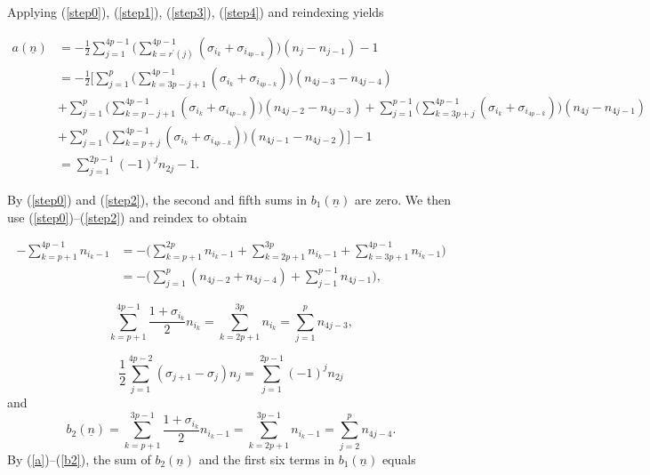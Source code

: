 \documentclass[11pt,reqno]{amsart}
\theoremstyle{definition}
\numberwithin{equation}{section}
\begin{document}
\noindent Applying (\ref{step0}), (\ref{step1}), (\ref{step3}), (\ref{step4}) and reindexing yields

\begin{equation} \label{a}
\begin{aligned}
a({\underline{n}}) & = -\frac{1}{2} \sum_{j=1}^{4p-1} \Biggl( \sum_{k=r^{\prime}(j)}^{4p-1} (\sigma_{i_k} + \sigma_{i_{4p - k}})\Biggr) (n_j - n_{j-1}) - 1 \\
& = -\frac{1}{2} \Biggl[ \sum_{j=1}^{p}  \Biggl( \sum_{k=3p-j+1}^{4p-1} (\sigma_{i_k} + \sigma_{i_{4p -k}})\Biggr) (n_{4j-3} - n_{4j-4}) \\
&  + \sum_{j=1}^{p} \Biggl( \sum_{k=p-j+1}^{4p-1} (\sigma_{i_k} + \sigma_{i_{4p -k}})\Biggr) (n_{4j-2} - n_{4j-3}) + \sum_{j=1}^{p-1} \Biggl( \sum_{k=3p+j}^{4p-1} (\sigma_{i_k} + \sigma_{i_{4p -k}})\Biggr) (n_{4j} - n_{4j-1}) \\
& + \sum_{j=1}^{p} \Biggl( \sum_{k=p+j}^{4p-1} (\sigma_{i_k} + \sigma_{i_{4p -k}})\Biggr) (n_{4j-1} - n_{4j-2}) \Biggr] - 1 \\
& = \sum_{j=1}^{2p-1} (-1)^j n_{2j} - 1.
\end{aligned}
\end{equation}

\noindent By (\ref{step0}) and (\ref{step2}), the second and fifth sums in $b_1({\underline{n}})$ are zero. We then use (\ref{step0})--(\ref{step2}) and reindex to obtain

\begin{equation} \label{thirdpart}
\begin{aligned}
-\sum_{k=p+1}^{4p-1} n_{i_{k} - 1} & = - \Biggl( \sum_{k=p+1}^{2p} n_{i_{k} - 1} + \sum_{k=2p+1}^{3p} n_{i_{k} - 1} + \sum_{k=3p+1}^{4p-1} n_{i_{k} - 1} \Biggr) \\
& = - \Biggl( \sum_{j=1}^{p} (n_{4j-2} + n_{4j-4}) + \sum_{j-1}^{p-1} n_{4j-1} \Biggr),
\end{aligned}
\end{equation}

\begin{equation} \label{fourthpart}
\sum_{k=p+1}^{4p-1} \frac{1+\sigma_{i_k}}{2} n_{i_k} = \sum_{k=2p+1}^{3p} n_{i_k} = \sum_{j=1}^{p} {n_{4j-3}},
\end{equation}

\begin{equation} \label{sixthpart}
\frac{1}{2} \sum_{j=1}^{4p-2} (\sigma_{j+1} - \sigma_j) n_j = \sum_{j=1}^{2p-1} (-1)^j n_{2j}
\end{equation}
and
\begin{equation} \label{b2}
b_2({\underline{n}}) = \sum_{k=p+1}^{3p-1} \frac{1+\sigma_{i_k}}{2} n_{{i_k} - 1} = \sum_{k=2p+1}^{3p-1} n_{{i_k} - 1} = \sum_{j=2}^{p} n_{4j-4}. 
\end{equation}
By (\ref{a})--(\ref{b2}), the sum of $b_2({\underline{n}})$ and the first six terms in $b_1({\underline{n}})$ equals
\end{document}
